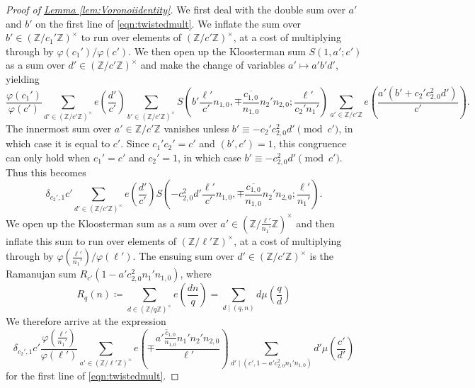 \documentclass[11pt,a4paper]{amsart}
\newcommand{\Z}{\mathbb{Z}}
\numberwithin{equation}{section}
\theoremstyle{remark}
\theoremstyle{definition}
\begin{document}
\begin{proof}[Proof of {\hyperref[lem:Voronoiidentity]{Lemma \ref*{lem:Voronoiidentity}}}]
We first deal with the double sum over $a'$ and $b'$ on the first line of \eqref{eqn:twistedmult}. We inflate the sum over $b' \in (\Z/c_1'\Z)^{\times}$ to run over elements of $(\Z/c'\Z)^{\times}$, at a cost of multiplying through by $\varphi(c_1')/\varphi(c')$. We then open up the Kloosterman sum $S(1,a';c')$ as a sum over $d' \in (\Z/c'\Z)^{\times}$ and make the change of variables $a' \mapsto a' b' d'$, yielding
\[\frac{\varphi(c_1')}{\varphi(c')} \sum_{d' \in (\Z/c'\Z)^{\times}} e\left(\frac{d'}{c'}\right) \sum_{b' \in (\Z/c'\Z)^{\times}} S\left(b' \frac{\ell'}{c'} n_{1,0}, \mp \overline{\frac{c_{1,0}}{n_{1,0}}} n_2' n_{2,0}; \frac{\ell'}{c_2' n_1'}\right) \sum_{a' \in \Z/c'\Z} e\left(\frac{a' (b' + c_2' c_{2,0}^2 d')}{c'}\right).\]
The innermost sum over $a' \in \Z/c'\Z$ vanishes unless $b' \equiv -c_2' c_{2,0}^2 d' \pmod{c'}$, in which case it is equal to $c'$. Since $c_1' c_2' = c'$ and $(b',c') = 1$, this congruence can only hold when $c_1' = c'$ and $c_2' = 1$, in which case $b' \equiv -c_{2,0}^2 d' \pmod{c'}$. Thus this becomes
\[\delta_{c_2',1} c' \sum_{d' \in (\Z/c'\Z)^{\times}} e\left(\frac{d'}{c'}\right) S\left(-c_{2,0}^2 d' \frac{\ell'}{c'} n_{1,0}, \mp \overline{\frac{c_{1,0}}{n_{1,0}}} n_2' n_{2,0}; \frac{\ell'}{n_1'}\right).\]
We open up the Kloosterman sum as a sum over $a' \in (\Z/\frac{\ell'}{n_1'}\Z)^{\times}$ and then inflate this sum to run over elements of $(\Z/\ell'\Z)^{\times}$, at a cost of multiplying through by $\varphi(\frac{\ell'}{n_1'})/\varphi(\ell')$. The ensuing sum over $d' \in (\Z/c'\Z)^{\times}$ is the Ramanujan sum $R_{c'}(1 - a' c_{2,0}^2 n_1' n_{1,0})$, where
\begin{equation}
\label{eqn:Rqndefeq}
R_q(n) \coloneqq \sum_{d \in (\Z/q\Z)^{\times}} e\left(\frac{dn}{q}\right) = \sum_{d \mid (q,n)} d \mu\left(\frac{q}{d}\right)
\end{equation}
We therefore arrive at the expression
\begin{equation}
\label{eqn:twistedmult2}
\delta_{c_2',1} c' \frac{\varphi\left(\frac{\ell'}{n_1'}\right)}{\varphi(\ell')} \sum_{a' \in (\Z/\ell'\Z)^{\times}} e\left(\mp \frac{\overline{a' \frac{c_{1,0}}{n_{1,0}}} n_1' n_2' n_{2,0}}{\ell'}\right) \sum_{d' \mid (c', 1 - a' c_{2,0}^2 n_1' n_{1,0})} d' \mu\left(\frac{c'}{d'}\right)
\end{equation}
for the first line of \eqref{eqn:twistedmult}.


\end{proof}
\end{document}
